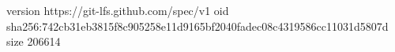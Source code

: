 version https://git-lfs.github.com/spec/v1
oid sha256:742cb31eb3815f8c905258e11d9165bf2040fadec08c4319586cc11031d5807d
size 206614
